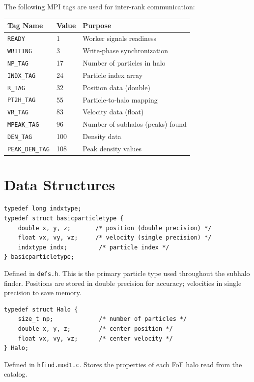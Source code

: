 \documentclass[11pt,fleqn]{book}
\newcommand{\code}[1]{\texttt{#1}}
\newcommand{\file}[1]{\texttt{#1}}
\begin{document}
The following MPI tags are used for inter-rank communication:

\begin{longtable}{L{5cm} C{2cm} L{6.5cm}}
\toprule
\textbf{Tag Name} & \textbf{Value} & \textbf{Purpose} \\
\midrule
\endhead
\code{READY}            & 1   & Worker signals readiness \\
\code{WRITING}          & 3   & Write-phase synchronization \\
\code{NP\_TAG}          & 17  & Number of particles in halo \\
\code{INDX\_TAG}        & 24  & Particle index array \\
\code{R\_TAG}           & 32  & Position data (double) \\
\code{PT2H\_TAG}        & 55  & Particle-to-halo mapping \\
\code{VR\_TAG}          & 83  & Velocity data (float) \\
\code{MPEAK\_TAG}       & 96  & Number of subhalos (peaks) found \\
\code{DEN\_TAG}         & 100 & Density data \\
\code{PEAK\_DEN\_TAG}   & 108 & Peak density values \\
\bottomrule
\end{longtable}

\section{Data Structures}

\begin{definition}
\begin{lstlisting}[style=ccode,numbers=none]
typedef long indxtype;
typedef struct basicparticletype {
    double x, y, z;       /* position (double precision) */
    float vx, vy, vz;     /* velocity (single precision) */
    indxtype indx;         /* particle index */
} basicparticletype;
\end{lstlisting}
Defined in \file{defs.h}.  This is the primary particle type used throughout the subhalo finder.  Positions are stored in double precision for accuracy; velocities in single precision to save memory.
\end{definition}

\begin{definition}[Halo]
\begin{lstlisting}[style=ccode,numbers=none]
typedef struct Halo {
    size_t np;             /* number of particles */
    double x, y, z;        /* center position */
    float vx, vy, vz;      /* center velocity */
} Halo;
\end{lstlisting}
Defined in \file{hfind.mod1.c}.  Stores the properties of each FoF halo read from the catalog.
\end{definition}
\end{document}
